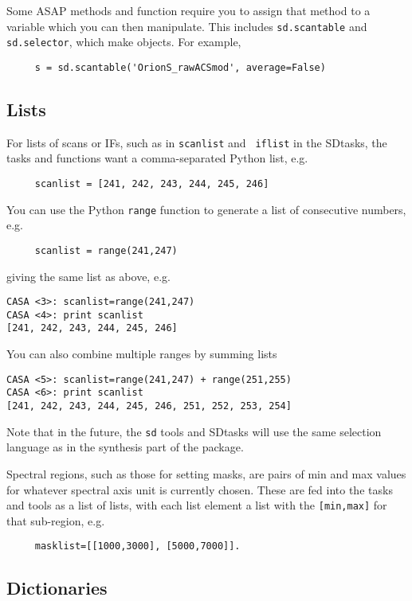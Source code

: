 Some ASAP methods and function require you to assign that method
to a variable which you can then manipulate.  This includes
{\tt sd.scantable} and {\tt sd.selector}, which make objects.
For example,
\small
\begin{verbatim}
     s = sd.scantable('OrionS_rawACSmod', average=False)
\end{verbatim}
\normalsize

\subsection{Lists}
\label{section:sd.intro.lists}

For lists of scans or IFs, such as in {\tt scanlist} and {\tt
iflist} in the SDtasks, the tasks and functions want a comma-separated 
Python list, e.g.
\small
\begin{verbatim}
     scanlist = [241, 242, 243, 244, 245, 246]
\end{verbatim}
\normalsize
You can use the Python {\tt range} function to generate a list of
consecutive numbers, e.g.
\small
\begin{verbatim}
     scanlist = range(241,247)
\end{verbatim}
\normalsize
giving the same list as above, e.g.
\small
\begin{verbatim}
CASA <3>: scanlist=range(241,247)
CASA <4>: print scanlist
[241, 242, 243, 244, 245, 246]
\end{verbatim}
\normalsize
You can also combine multiple ranges by summing lists
\small
\begin{verbatim}
CASA <5>: scanlist=range(241,247) + range(251,255)
CASA <6>: print scanlist
[241, 242, 243, 244, 245, 246, 251, 252, 253, 254]
\end{verbatim}
\normalsize
Note that in the future, the {\tt sd} tools and SDtasks will use
the same selection language as in the synthesis part of the package.

Spectral regions, such as those for setting masks, are pairs of
min and max values for whatever spectral axis unit is currently
chosen.  These are fed into the tasks and tools as a list of lists,
with each list element a list with the {\tt [min,max]} for that
sub-region, e.g.
\small
\begin{verbatim}
     masklist=[[1000,3000], [5000,7000]].
\end{verbatim}
\normalsize

\subsection{Dictionaries}
\label{section:sd.intro.dict}


